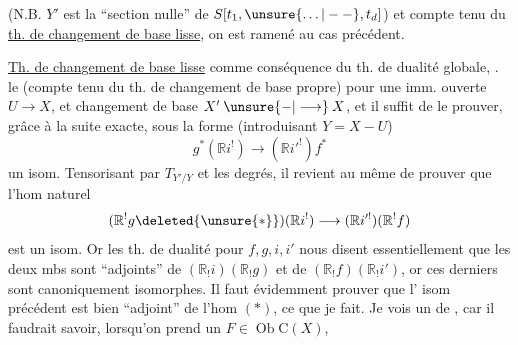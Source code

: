 
(N.B. $Y'$ est la ``section nulle'' de $S[t_1,\unsure{\ldots|--},t_d]$)
et compte tenu du \uline{th. de changement de base lisse},
on est ramené au cas précédent.

\uline{Th. de changement de base lisse} comme conséquence
du th. de dualité globale, .
 le  (compte
tenu du th. de changement de base propre) pour une
imm. ouverte
$U\longrightarrow X$,  et changement de base
 $X'\mathbin{\unsure{-|\longrightarrow}}X$,
et il suffit de le prouver, grâce à la suite exacte,
sous la forme (introduisant $Y=X-U$)
\[
g^*(\mathbb{R}i^!)\longrightarrow(\mathbb{R}i'^!)f^*
\]
un isom. Tensorisant par
$T_{Y'/Y}$ et  les degrés, il
revient au même de prouver que l'hom
naturel
\[
(\mathbb{R}^!g\deleted{\unsure{*}})(\mathbb{R}i^!)\longrightarrow(\mathbb{R}i'^!)(\mathbb{R}^!f)
\]
est un isom. Or  les th. de dualité
pour $f,g,i,i'$ nous disent essentiellement que
les deux mbs sont ``adjoints'' de
$(\mathbb{R}_!i)(\mathbb{R}_!g)$ et de $(\mathbb{R}_!f)(\mathbb{R}_!i')$, or ces derniers
sont canoniquement isomorphes. Il faut évidemment
prouver que l' isom  précédent est bien
``adjoint'' de l'hom $(*)$, ce que je  fait.
Je vois un  de , car il faudrait
savoir, lorsqu'on prend un  $F\in\operatorname{Ob}\mathrm{C}(X)$,

